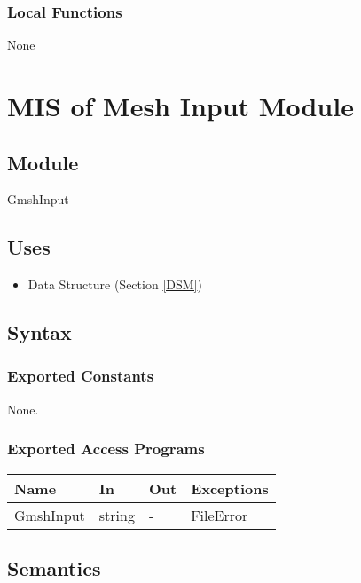 \documentclass[12pt, titlepage]{article}
\begin{document}
	
	\subsubsection{Local Functions}
	
	None
	
	\newpage %
	
	\section{MIS of Mesh Input Module} \label{MIM}
	
	\subsection{Module} GmshInput
	
	\subsection{Uses} \begin{itemize} \item Data Structure (Section \ref{DSM})
		
	\end{itemize}
	
	\subsection{Syntax}
	
	\subsubsection{Exported Constants} None. \subsubsection{Exported Access
		Programs}
	
	\begin{center} \begin{tabular}{p{4cm} p{2cm} p{2cm} p{2cm}} \hline
			\textbf{Name} & \textbf{In} & \textbf{Out} & \textbf{Exceptions} \\ \hline
			GmshInput & string & - & FileError \\ \hline \end{tabular} \end{center}
	
	\subsection{Semantics}
	
\end{document}
